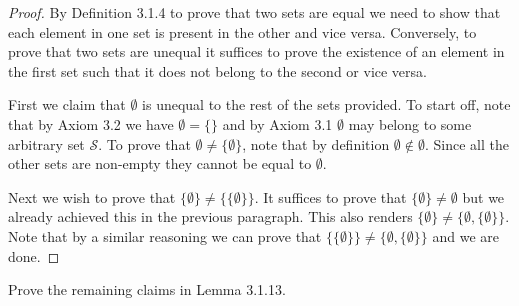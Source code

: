 \documentclass[12pt]{article}
\theoremstyle{remark}
\newcommand{\exercise}[1]{\noindent {\bf Exercise #1.}}
\newenvironment{ques}[1][]{%
	\begin{mdframed}[style=mdblackbox]
		\exercise{#1}
}{%
\end{mdframed}
}
\begin{document}
\begin{proof}
	By Definition 3.1.4 to prove that two sets are equal we need to show that each element in one set is present in the other and vice versa. Conversely, to prove that two sets are unequal it suffices to prove the existence of an element in the first set such that it does not belong to the second or vice versa. \par
	First we claim that $ \emptyset $ is unequal to the rest of the sets provided. To start off, note that by Axiom 3.2 we have $ \emptyset = \{ \} $ and by Axiom 3.1 $ \emptyset $ may belong to some arbitrary set $ \mathcal{S} $. To prove that $ \emptyset \neq \{ \emptyset \} $, note that by definition $ \emptyset \notin \emptyset $. Since all the other sets are non-empty they cannot be equal to $ \emptyset $. \par
	Next we wish to prove that $ \{ \emptyset \} \neq \{ \{ \emptyset \} \}$. It suffices to prove that $ \{ \emptyset \} \neq \emptyset $ but we already achieved this in the previous paragraph. This also renders $ \{ \emptyset \} \neq \{ \emptyset, \{ \emptyset \} \}$. Note that by a similar reasoning we can prove that $ \{ \{ \emptyset \} \} \neq  \{ \emptyset, \{ \emptyset \} \} $ and we are done.

\end{proof}

\begin{ques}[3.1.3]
    Prove the remaining claims in Lemma 3.1.13.
\end{ques}
\end{document}
